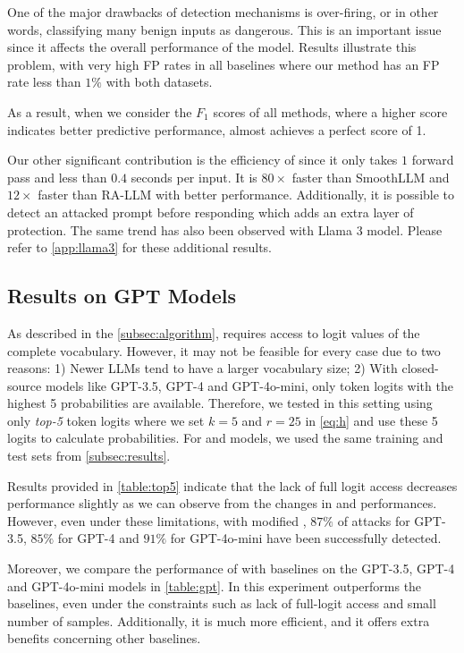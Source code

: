 One of the major drawbacks of detection mechanisms is over-firing, or in other words, classifying many benign inputs as dangerous. This is an important issue since it affects the overall performance of the model. Results illustrate this problem, with very high FP rates in all baselines where our method has an FP rate less than $1\%$ with \llama{} both datasets.

As a result, when we consider the $F_1$ scores of all methods, where a higher score indicates better predictive performance, \methodname{} almost achieves a perfect score of 1. 

Our other significant contribution is the efficiency of \methodname{} since it only takes $1$ forward pass and less than $0.4$ seconds per input. It is $80\times$ faster than SmoothLLM and $12\times$ faster than RA-LLM with better performance. Additionally, it is possible to detect an attacked prompt before responding which adds an extra layer of protection.  The same trend has also been observed with Llama 3 model. Please refer to \cref{app:llama3} for these additional results.

\subsection{Results on GPT Models}
\label{app:gpt}

As described in the \cref{subsec:algorithm}, \methodname{} requires access to logit values of the complete vocabulary. However, it may not be feasible for every case due to two reasons: 1) Newer LLMs tend to have a larger vocabulary size; 2) With closed-source models like  GPT-3.5, GPT-4 and GPT-4o-mini, only token logits with the highest 5 probabilities are available. Therefore, we tested \methodname{} in this setting using only \emph{top-5} token logits where we set $k=5$ and $r=25$ in \cref{eq:h} and use these 5 logits to calculate probabilities. For \llama{} and \vicuna{} models, we used the same training and test sets from \cref{subsec:results}.

Results provided in \cref{table:top5} indicate that the lack of full logit access decreases performance slightly as we can observe from the changes in \llama{} and \vicuna{} performances. However, even under these limitations, with modified \methodname{}, $87\%$ of attacks for GPT-3.5, $85\%$ for GPT-4 and $91\%$ for GPT-4o-mini have been successfully detected. %

Moreover, we compare the performance of \methodname{} with baselines on the GPT-3.5, GPT-4 and GPT-4o-mini models in \cref{table:gpt}. In this experiment \methodname{} outperforms the baselines, even under the constraints such as lack of full-logit access and small number of samples. Additionally, it is much more efficient, and it offers extra benefits concerning other baselines.

